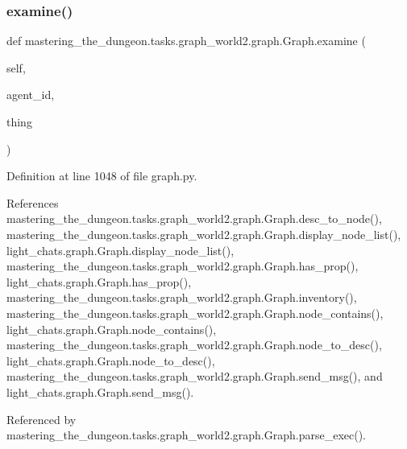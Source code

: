 \subsubsection{\texorpdfstring{examine()}{examine()}}
{\footnotesize\ttfamily def mastering\+\_\+the\+\_\+dungeon.\+tasks.\+graph\+\_\+world2.\+graph.\+Graph.\+examine (\begin{DoxyParamCaption}\item[{}]{self,  }\item[{}]{agent\+\_\+id,  }\item[{}]{thing }\end{DoxyParamCaption})}



Definition at line 1048 of file graph.\+py.



References mastering\+\_\+the\+\_\+dungeon.\+tasks.\+graph\+\_\+world2.\+graph.\+Graph.\+desc\+\_\+to\+\_\+node(), mastering\+\_\+the\+\_\+dungeon.\+tasks.\+graph\+\_\+world2.\+graph.\+Graph.\+display\+\_\+node\+\_\+list(), light\+\_\+chats.\+graph.\+Graph.\+display\+\_\+node\+\_\+list(), mastering\+\_\+the\+\_\+dungeon.\+tasks.\+graph\+\_\+world2.\+graph.\+Graph.\+has\+\_\+prop(), light\+\_\+chats.\+graph.\+Graph.\+has\+\_\+prop(), mastering\+\_\+the\+\_\+dungeon.\+tasks.\+graph\+\_\+world2.\+graph.\+Graph.\+inventory(), mastering\+\_\+the\+\_\+dungeon.\+tasks.\+graph\+\_\+world2.\+graph.\+Graph.\+node\+\_\+contains(), light\+\_\+chats.\+graph.\+Graph.\+node\+\_\+contains(), mastering\+\_\+the\+\_\+dungeon.\+tasks.\+graph\+\_\+world2.\+graph.\+Graph.\+node\+\_\+to\+\_\+desc(), light\+\_\+chats.\+graph.\+Graph.\+node\+\_\+to\+\_\+desc(), mastering\+\_\+the\+\_\+dungeon.\+tasks.\+graph\+\_\+world2.\+graph.\+Graph.\+send\+\_\+msg(), and light\+\_\+chats.\+graph.\+Graph.\+send\+\_\+msg().



Referenced by mastering\+\_\+the\+\_\+dungeon.\+tasks.\+graph\+\_\+world2.\+graph.\+Graph.\+parse\+\_\+exec().

